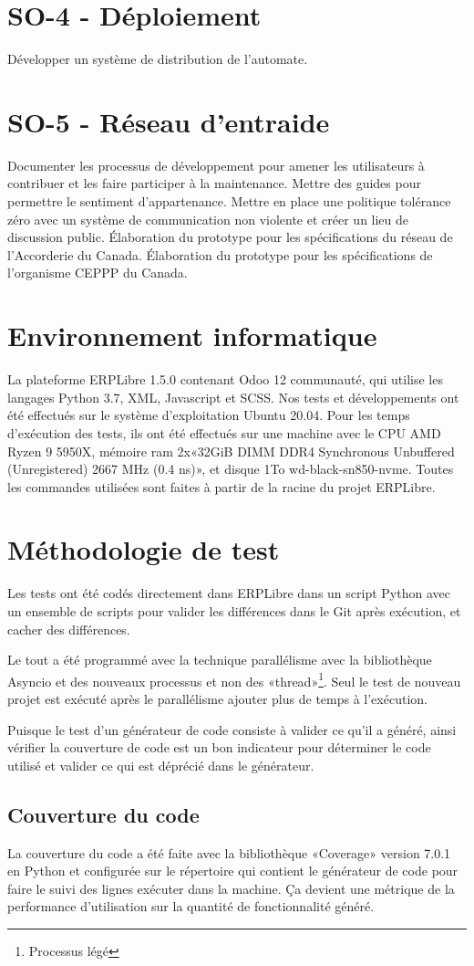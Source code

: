 \section{SO-4 - Déploiement}
Développer un système de distribution de l’automate.

\section{SO-5 - Réseau d’entraide}
Documenter les processus de développement pour amener les utilisateurs à contribuer et les faire participer à la maintenance. Mettre des guides pour permettre le sentiment d'appartenance. Mettre en place une politique tolérance zéro avec un système de communication non violente et créer un lieu de discussion public. Élaboration du prototype pour les spécifications du réseau de l’Accorderie du Canada. Élaboration du prototype pour les spécifications de l’organisme CEPPP du Canada.

\section{Environnement informatique}
La plateforme ERPLibre 1.5.0 contenant Odoo 12 communauté, qui utilise les langages Python 3.7, XML, Javascript et SCSS. Nos tests et développements ont été effectués sur le système d’exploitation Ubuntu 20.04.
Pour les temps d’exécution des tests, ils ont été effectués sur une machine avec le CPU AMD Ryzen 9 5950X, mémoire ram 2x«32GiB DIMM DDR4 Synchronous Unbuffered (Unregistered) 2667 MHz (0.4 ns)», et disque 1To wd-black-sn850-nvme.
Toutes les commandes utilisées sont faites à partir de la racine du projet ERPLibre.

\section{Méthodologie de test}
Les tests ont été codés directement dans ERPLibre dans un script Python avec un ensemble de scripts pour valider les différences dans le Git après exécution, et cacher des différences.

Le tout a été programmé avec la technique parallélisme avec la bibliothèque Asyncio et des nouveaux processus et non des «thread»\footnote{Processus légé}. Seul le test de nouveau projet est exécuté après le parallélisme ajouter plus de temps à l’exécution.

Puisque le test d’un générateur de code consiste à valider ce qu’il a généré, ainsi vérifier la couverture de code est un bon indicateur pour déterminer le code utilisé et valider ce qui est déprécié dans le générateur.

\subsection{Couverture du code}
La couverture du code a été faite avec la bibliothèque «Coverage» version 7.0.1 en Python et configurée sur le répertoire qui contient le générateur de code pour faire le suivi des lignes exécuter dans la machine. Ça devient une métrique de la performance d’utilisation sur la quantité de fonctionnalité généré.
